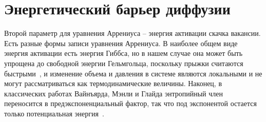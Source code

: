 \documentclass[master,14pt,subf,href,colorlinks=true
]{disser}
\begin{document}
\section{Энергетический барьер диффузии}\label{chapter_barrier}
Второй параметр для уравнения Аррениуса -- энергия активации скачка вакансии. Есть разные формы записи уравнения Аррениуса. В наиболее общем виде энергия активации есть энергия Гиббса, но в нашем случае она может быть упрощена до свободной энергии Гельмгольца, поскольку прыжки считаются быстрыми~\cite{Valikova_2010}, и изменение объема и давления в системе являются локальными и не могут рассматриваться как термодинамические величины. Наконец, в классических работах Вайнъярда, Мэнли и Глайда энтропийный член переносится в предэкспоненциальный фактор, так что под экспонентой остается только потенциальная энергия~\cite{Vineyard,Manley_1960,Glyde_1967}.
\end{document}

